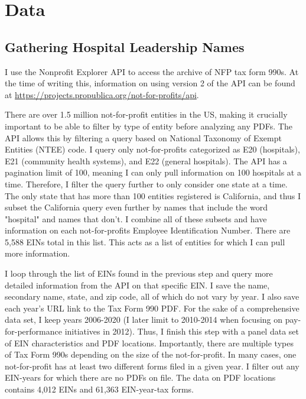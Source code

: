 \documentclass[12pt]{article}
\begin{document}
    

	
	\newpage

    \printbibliography

\appendix

 \section{Data}\label{appendixdata}

\subsection{Gathering Hospital Leadership Names}

I use the Nonprofit Explorer API to access the archive of NFP tax form 990s. At the time of writing this, information on using version 2 of the API can be found at \hyperlink{https://projects.propublica.org/not-for-profits/api}{https://projects.propublica.org/not-for-profits/api}. 
    
There are over 1.5 million not-for-profit entities in the US, making it crucially important to be able to filter by type of entity before analyzing any PDFs. The API allows this by filtering a query based on National Taxonomy of Exempt Entities (NTEE) code. I query only not-for-profits categorized as E20 (hospitals), E21 (community health systems), and E22 (general hospitals). The API has a pagination limit of 100, meaning I can only pull information on 100 hospitals at a time. Therefore, I filter the query further to only consider one state at a time. The only state that has more than 100 entities registered is California, and thus I subset the California query even further by names that include the word "hospital" and names that don't. I combine all of these subsets and have information on each not-for-profits Employee Identification Number. There are 5,588 EINs total in this list. This acts as a list of entities for which I can pull more information. 

I loop through the list of EINs found in the previous step and query more detailed information from the API on that specific EIN. I save the name, secondary name, state, and zip code, all of which do not vary by year. I also save each year's URL link to the Tax Form 990 PDF. For the sake of a comprehensive data set, I keep years 2006-2020 (I later limit to 2010-2014 when focusing on pay-for-performance initiatives in 2012). Thus, I finish this step with a panel data set of EIN characteristics and PDF locations. Importantly, there are multiple types of Tax Form 990s depending on the size of the not-for-profit. In many cases, one not-for-profit has at least two different forms filed in a given year. I filter out any EIN-years for which there are no PDFs on file. The data on PDF locations contains 4,012 EINs and 61,363 EIN-year-tax forms.
\end{document}
